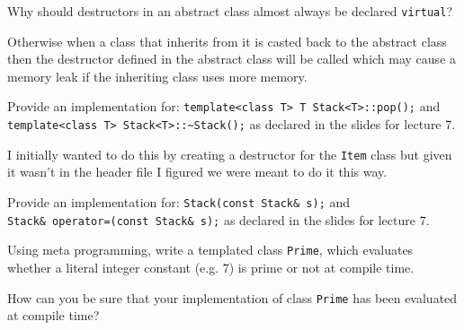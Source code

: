 \documentclass{supervision}
\begin{document}
\begin{questions}
      \begin{solution}
      \end{solution}

    \question Why should destructors in an abstract class almost always be
      declared \lstinline|virtual|?
      \begin{solution}
        Otherwise when a class that inherits from it is casted back to the
        abstract class then the destructor defined in the abstract class will
        be called which may cause a memory leak if the inheriting class uses
        more memory.
      \end{solution}

    \question Provide an implementation for:
      \lstinline|template<class T> T Stack<T>::pop();| and
      \lstinline|template<class T> Stack<T>::~Stack();| as declared in the
      slides for lecture 7.
      \begin{solution}
        I initially wanted to do this by creating a destructor for the
        \lstinline|Item| class but given it wasn't in the header file I
        figured we were meant to do it this way.
      \end{solution}

    \question Provide an implementation for: \lstinline|Stack(const Stack& s);|
      and \\ \lstinline|Stack& operator=(const Stack& s);| as declared in the
      slides for lecture 7.
    \begin{solution}
    \end{solution}

    \question Using meta programming, write a templated class
      \lstinline|Prime|, which evaluates whether a literal integer constant
      (e.g. $7$) is prime or not at compile time.
      \begin{solution}
      \end{solution}

    \question How can you be sure that your implementation of class
      \lstinline|Prime| has been evaluated at compile time?
      \begin{solution}
      \end{solution}


\end{questions}
\end{document}
